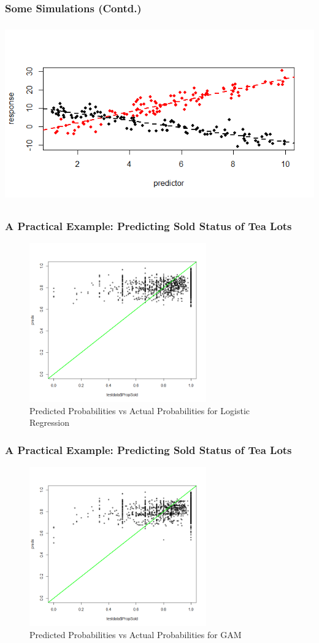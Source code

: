 \documentclass{beamer}
\begin{document}
\begin{frame}
	\frametitle{Some Simulations (Contd.)}
	\includegraphics[width = \linewidth, height = 3in]{./simplot_2.png}
\end{frame}

\begin{frame}
	\frametitle{A Practical Example: Predicting Sold Status of Tea Lots}
	\begin{figure}
		\caption{Predicted Probabilities vs Actual Probabilities for Logistic Regression}
		\includegraphics[height= 2.7in]{./pracplot_1.png}
	\end{figure}
\end{frame}

\begin{frame}
\frametitle{A Practical Example: Predicting Sold Status of Tea Lots}
\begin{figure}
	\caption{Predicted Probabilities vs Actual Probabilities for GAM}
	\includegraphics[height= 2.7in]{./pracplot_2.png}
\end{figure}
\end{frame}
\end{document}
